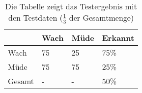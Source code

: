 \begin{table}[t]
 \centering
 \caption[KNN Ergebnis-Matrix]{Die Tabelle zeigt das Testergebnis mit den Testdaten ($\frac{1}{3}$ der Gesamtmenge)}
 \begin{tabular}{l|lll}
   & Wach & Müde & Erkannt \\ \hline
  Wach & 75 & 25 & 75\%\\  
  Müde & 75 & 75 & 25\%\\ 
  Gesamt & - & - & 50\%\\ 
 \end{tabular}
 \label{tab:ann_results}
\end{table}